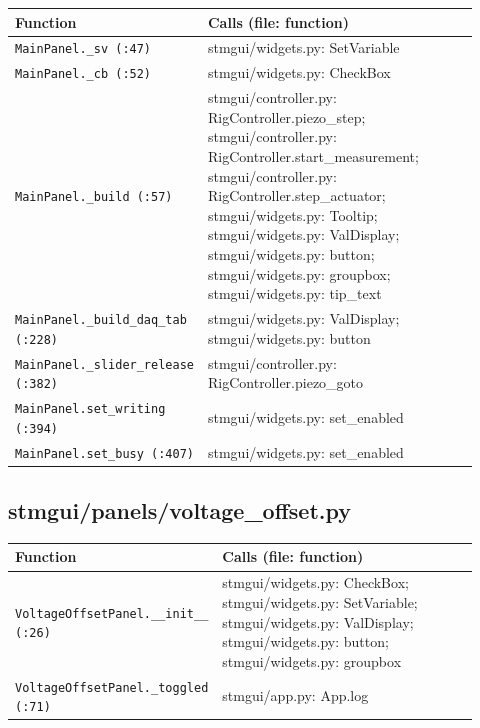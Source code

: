 \small\setlength{\LTleft}{0pt}\setlength{\LTright}{\fill}
\begin{longtable}{@{}>{\raggedright\arraybackslash}p{0.280\linewidth}>{\raggedright\arraybackslash}p{0.640\linewidth}@{}}
\toprule
\textbf{Function} & \textbf{Calls (file: function)} \\
\midrule\endhead
\texttt{Main\discretionary{}{}{}Panel.\discretionary{}{}{}\_\discretionary{}{}{}sv (:47)} & stmgui/widgets.py: SetVariable \\
\texttt{Main\discretionary{}{}{}Panel.\discretionary{}{}{}\_\discretionary{}{}{}cb (:52)} & stmgui/widgets.py: CheckBox \\
\texttt{Main\discretionary{}{}{}Panel.\discretionary{}{}{}\_\discretionary{}{}{}build (:57)} & stmgui/controller.py: RigController.piezo\_step; stmgui/controller.py: RigController.start\_measurement; stmgui/controller.py: RigController.step\_actuator; stmgui/widgets.py: Tooltip; stmgui/widgets.py: ValDisplay; stmgui/widgets.py: button; stmgui/widgets.py: groupbox; stmgui/widgets.py: tip\_text \\
\texttt{Main\discretionary{}{}{}Panel.\discretionary{}{}{}\_\discretionary{}{}{}build\_\discretionary{}{}{}daq\_\discretionary{}{}{}tab (:228)} & stmgui/widgets.py: ValDisplay; stmgui/widgets.py: button \\
\texttt{Main\discretionary{}{}{}Panel.\discretionary{}{}{}\_\discretionary{}{}{}slider\_\discretionary{}{}{}release (:382)} & stmgui/controller.py: RigController.piezo\_goto \\
\texttt{Main\discretionary{}{}{}Panel.\discretionary{}{}{}set\_\discretionary{}{}{}writing (:394)} & stmgui/widgets.py: set\_enabled \\
\texttt{Main\discretionary{}{}{}Panel.\discretionary{}{}{}set\_\discretionary{}{}{}busy (:407)} & stmgui/widgets.py: set\_enabled \\
\bottomrule
\end{longtable}
\normalsize

\subsection{stmgui/panels/voltage\_offset.py}

\small\setlength{\LTleft}{0pt}\setlength{\LTright}{\fill}
\begin{longtable}{@{}>{\raggedright\arraybackslash}p{0.280\linewidth}>{\raggedright\arraybackslash}p{0.640\linewidth}@{}}
\toprule
\textbf{Function} & \textbf{Calls (file: function)} \\
\midrule\endhead
\texttt{Voltage\discretionary{}{}{}Offset\discretionary{}{}{}Panel.\discretionary{}{}{}\_\discretionary{}{}{}\_\discretionary{}{}{}init\_\discretionary{}{}{}\_\discretionary{}{}{} (:26)} & stmgui/widgets.py: CheckBox; stmgui/widgets.py: SetVariable; stmgui/widgets.py: ValDisplay; stmgui/widgets.py: button; stmgui/widgets.py: groupbox \\
\texttt{Voltage\discretionary{}{}{}Offset\discretionary{}{}{}Panel.\discretionary{}{}{}\_\discretionary{}{}{}toggled (:71)} & stmgui/app.py: App.log \\
\bottomrule
\end{longtable}
\normalsize

